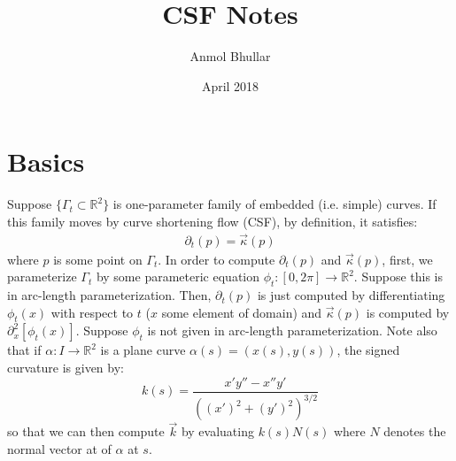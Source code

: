 \documentclass{article}
\title{CSF Notes}
\author{Anmol Bhullar}
\date{April 2018}
\begin{document}
\maketitle

\section{Basics}

Suppose $\{\Gamma_t\subset\mathbb{R}^2\}$ is one-parameter family of embedded (i.e. simple) curves. If
this family moves by curve shortening flow (CSF), by definition, it satisfies:
\begin{align} \tag{1.1}
    \partial_t (p) = \vec{\kappa}(p)
\end{align}
where $p$ is some point on $\Gamma_t$. In order to compute $\partial_t(p)$ and $\vec{\kappa}(p)$, first, we
parameterize $\Gamma_t$ by some parameteric equation $\phi_t:[0,2\pi]\to\mathbb{R}^2$. Suppose this is in
arc-length parameterization. Then, $\partial_t(p)$ is just computed by differentiating $\phi_t(x)$ 
with respect to $t$ ($x$ some element of domain) and $\vec{\kappa}(p)$ is computed by $\partial_x^2[\phi_t(x)]$.
Suppose $\phi_t$ is not given in arc-length parameterization. Note also that if $\alpha: I\to\mathbb{R}^2$ is 
a plane curve $\alpha(s) = (x(s),y(s))$, the signed curvature is given by:
\[ k(s) = \frac{x'y''-x''y'}{((x')^2+(y')^2)^{3/2}}\]
so that we can then compute $\vec{k}$ by evaluating $k(s)N(s)$ where $N$ denotes the normal vector at of $\alpha$ at 
$s$.
\end{document}
